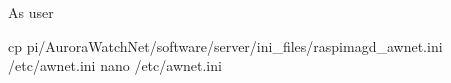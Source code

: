 As user \rootUser
\begin{Cmd}[fontsize=\relsize{-1.75}]
cp \mytilde{}pi/AuroraWatchNet/software/server/ini_files/raspimagd_awnet.ini /etc/awnet.ini
nano /etc/awnet.ini
\end{Cmd}


